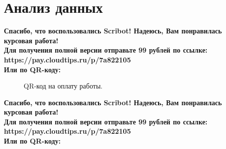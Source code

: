 \documentclass{article}
\begin{document}
\newpage

\section{Анализ данных}
\begin{center}
    \textbf{
        Спасибо, что воспользовались Scribot! Надеюсь, Вам понравилась курсовая работа!\\
        Для получения полной версии отправьте 99 рублей по ссылке:\\
        https://pay.cloudtips.ru/p/7a822105\\
        Или по QR-коду:\\
    }
\end{center}
\begin{figure}[h]
    \caption{QR-код на оплату работы.}
    \label{ris:image}
\end{figure}
\newpage
\begin{center}
    \textbf{
        Спасибо, что воспользовались Scribot! Надеюсь, Вам понравилась курсовая работа!\\
        Для получения полной версии отправьте 99 рублей по ссылке:\\
        https://pay.cloudtips.ru/p/7a822105\\
        Или по QR-коду:\\
    }
\end{center}
\end{document}
